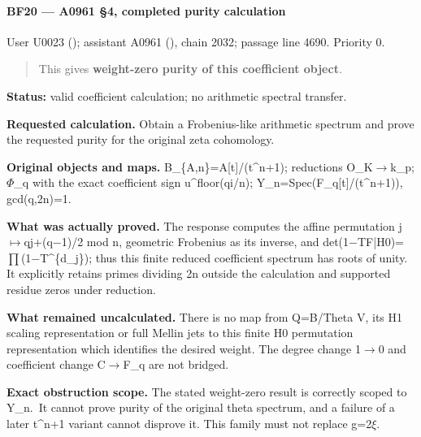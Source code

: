 \paragraph{BF20 --- A0961 §4, completed purity
calculation}\label{bf20-a0961-4-completed-purity-calculation}

User U0023 (\protect{});
assistant A0961 (\protect{}),
chain 2032; passage line 4690. Priority 0.

\begin{quote}
This gives \textbf{weight-zero purity of this coefficient object}.
\end{quote}

\textbf{Status:} valid coefficient calculation; no arithmetic spectral
transfer.

\textbf{Requested calculation.} Obtain a Frobenius-like arithmetic
spectrum and prove the requested purity for the original zeta
cohomology.

\textbf{Original objects and maps.} B\_\{A,n\}=A{[}t{]}/(t\^{}n+1);
reductions O\_K\allowbreak{}\ensuremath{→}\allowbreak{}k\_p;
\allowbreak{}\ensuremath{Φ}\allowbreak{}\_q with the exact coefficient
sign u\^{}floor(qi/n); Y\_n=Spec(F\_q{[}t{]}/(t\^{}n+1)), gcd(q,2n)=1.

\textbf{What was actually proved.} The response computes the affine
permutation
j\allowbreak{}\ensuremath{↦}\allowbreak{}qj+(q\allowbreak{}\ensuremath{−}\allowbreak{}1)/2
mod n, geometric Frobenius as its inverse, and
det(1\allowbreak{}\ensuremath{−}\allowbreak{}TF|H0)=\allowbreak{}\ensuremath{∏}\allowbreak{}(1\allowbreak{}\ensuremath{−}\allowbreak{}T\textasciicircum{}\{d\_j\});
thus this finite reduced coefficient spectrum has roots of unity. It
explicitly retains primes dividing 2n outside the calculation and
supported residue zeros under reduction.

\textbf{What remained uncalculated.} There is no map from Q=B/Theta V,
its H1 scaling representation or full Mellin jets to this finite H0
permutation representation which identifies the desired weight. The
degree change 1\allowbreak{}\ensuremath{→}\allowbreak{}0 and coefficient
change C\allowbreak{}\ensuremath{→}\allowbreak{}F\_q are not bridged.

\textbf{Exact obstruction scope.} The stated weight-zero result is
correctly scoped to Y\_n.~It cannot prove purity of the original theta
spectrum, and a failure of a later t\^{}n+1 variant cannot disprove it.
This family must not replace
g=2\allowbreak{}\ensuremath{ξ}\allowbreak{}.

